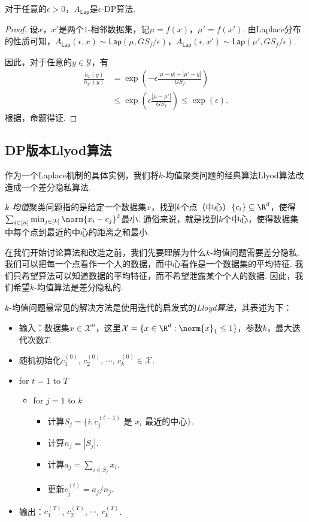 \begin{theorem}\label{thm:laplace-mechanism}
    对于任意的$\epsilon > 0$，$A_{\mathsf{Lap}}$是$\epsilon$-DP算法.
\end{theorem}
\begin{proof}
设$x$，$x'$是两个$1$-相邻数据集，记$\mu = f(x)$，$\mu' = f(x')$. 由Laplace分布的性质可知，$A_{\mathsf{Lap}}(\epsilon, x) \sim \mathsf{Lap}(\mu, GS_f/\epsilon)$，$A_{\mathsf{Lap}}(\epsilon, x') \sim \mathsf{Lap}(\mu', GS_f/\epsilon)$.

因此，对于任意的$y \in \mathcal Y$，有
    \[
    \begin{aligned}
        \frac{h_{x}(y)}{h_{x'}(y)} &=\exp \left(-\epsilon \frac{|\mu - y| - |\mu' - y|}{GS_f} \right) \\
        &\leq \exp \left(\epsilon \frac{|\mu - \mu'|}{GS_f} \right)\leq \exp(\epsilon).
    \end{aligned}
    \]
根据，命题得证. 
\end{proof}

\subsection{DP版本Llyod算法}
作为一个Laplace机制的具体实例，我们将$k$-均值聚类问题的经典算法Llyod算法改造成一个差分隐私算法.

\emph{$k$-均值}聚类问题指的是给定一个数据集$x$，找到$k$个点（中心）$\{c_i\} \subseteq \R^d$，使得$\sum_{i \in [n]} \min_{j\in[k]} \norm{x_i - c_j}^2$最小. 通俗来说，就是找到$k$个中心，使得数据集中每个点到最近的中心的距离之和最小. 

在我们开始讨论算法和改造之前，我们先要理解为什么$k$-均值问题需要差分隐私. 我们可以把每一个点看作一个人的数据，而中心看作是一个数据集的平均特征. 我们只希望算法可以知道数据的平均特征，而不希望泄露某个个人的数据. 因此，我们希望$k$-均值算法是差分隐私的.

$k$-均值问题最常见的解决方法是使用迭代的启发式的\emph{Lloyd算法}，其表述为下：
\begin{itemize}
    \item 输入：数据集$x \in \mathcal X^n$，这里$\mathcal X = \{x \in \R^d : \norm{x}_1 \leq 1 \}$，参数$k$，最大迭代次数$T$.
    \item 随机初始化$c_1^{(0)}$, $c_2^{(0)}$, $\cdots$, $c_k^{(0)} \in \mathcal X$.
    \item for $t=1$ to $T$
    \begin{itemize}
        \item for $j=1$ to $k$
        \begin{itemize}
            \item 计算$S_j = \{i : c_{j}^{(t-1)} \text{ 是\ } x_i \text{ 最近的中心}\}$.
            \item 计算$n_j = |S_j|$.
            \item 计算$a_j = \sum_{i\in S_j} x_i$.
            \item 更新$c_j^{(t)} = a_j/n_j$.
        \end{itemize}
    \end{itemize}
    \item 输出：$c_1^{(T)}$, $c_2^{(T)}$, $\cdots$, $c_k^{(T)}$.
\end{itemize}

